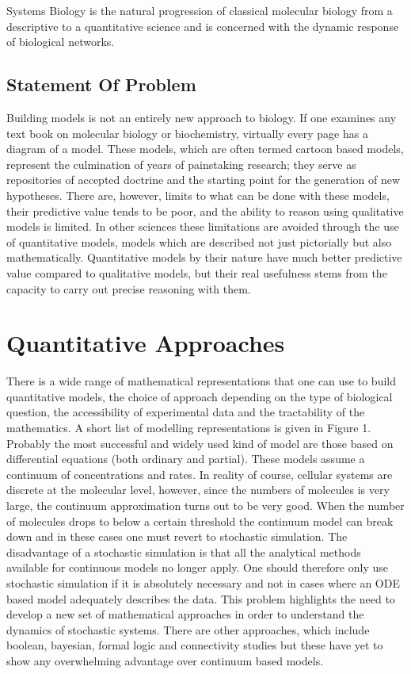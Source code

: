 \documentclass[12pt]{article}
\begin{document}
Systems Biology is the natural progression of classical molecular
biology from a descriptive to a quantitative science and is
concerned with the dynamic response of biological networks.

\subsection{Statement Of Problem}

Building models is not an entirely new approach to biology. If one
examines any text book on molecular biology or biochemistry,
virtually every page has a diagram of a model. These models,
which are often termed cartoon based models, represent the culmination
of years of painstaking research; they serve as repositories of
accepted doctrine and the starting point for the generation of new
hypotheses. There are, however, limits to what can be done with
these models, their predictive value tends to be poor, and
the ability to reason using qualitative models is limited. In
other sciences these limitations are avoided through the use of
quantitative models, models which are described not just
pictorially but also mathematically. Quantitative models by their
nature have much better predictive value compared to qualitative
models, but their real usefulness stems from the capacity to carry
out precise reasoning with them.

\section{Quantitative Approaches}

There is a wide range of mathematical representations that one can
use to build quantitative models, the choice of approach depending
on the type of biological question, the accessibility of
experimental data and the tractability of the mathematics. A short
list of modelling representations is given in Figure 1. Probably the most successful and
widely used kind of model are those based on differential
equations (both ordinary and partial). These models assume a
continuum of concentrations and rates. In reality of course,
cellular systems are discrete at the molecular level, however,
since the numbers of molecules is very large, the continuum
approximation turns out to be very good. When the number of
molecules drops to below a certain threshold the continuum model
can break down and in these cases one must revert to stochastic
simulation. The disadvantage of a stochastic simulation is that
all the analytical methods available for continuous models no
longer apply. One should therefore only use stochastic simulation
if it is absolutely necessary and not in cases where an ODE based
model adequately describes the data. This problem highlights the need to develop a
new set of mathematical approaches in order to understand the dynamics of
stochastic systems. There are other approaches, which
include boolean, bayesian, formal logic and connectivity studies
but these have yet to show any overwhelming advantage over
continuum based models.
\end{document}
